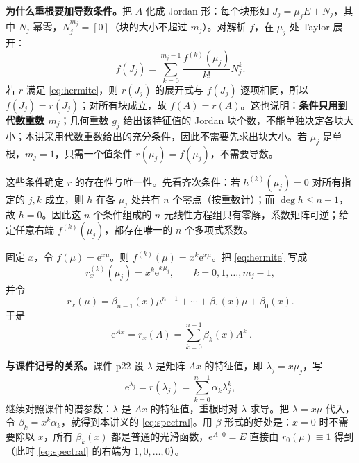 \documentclass[11pt]{ctexart}
\let\basesubhdr\subhdr
\renewcommand{\subhdr}[1]{\needspace{8\baselineskip}\basesubhdr{#1}}
\newcommand{\ee}{\mathrm{e}}
\begin{document}
\textbf{为什么重根要加导数条件。}把 $A$ 化成 Jordan 形：每个块形如 $J_j=\mu_jE+N_j$，其中 $N_j$ 幂零，$N_j^{m_j}=[0]$（块的大小不超过 $m_j$）。对解析 $f$，在 $\mu_j$ 处 Taylor 展开：
\[
f(J_j)=\sum_{k=0}^{m_j-1}\frac{f^{(k)}(\mu_j)}{k!}N_j^k .
\]
若 $r$ 满足 \eqref{eq:hermite}，则 $r(J_j)$ 的展开式与 $f(J_j)$ 逐项相同，所以 $f(J_j)=r(J_j)$；对所有块成立，故 $f(A)=r(A)$。这也说明：\textbf{条件只用到代数重数 $m_j$}；几何重数 $g_j$ 给出该特征值的 Jordan 块个数，不能单独决定各块大小；本讲采用代数重数给出的充分条件，因此不需要先求出块大小。若 $\mu_j$ 是单根，$m_j=1$，只需一个值条件 $r(\mu_j)=f(\mu_j)$，不需要导数。

这些条件确定 $r$ 的存在性与唯一性。先看齐次条件：若 $h^{(k)}(\mu_j)=0$ 对所有指定的 $j,k$ 成立，则 $h$ 在各 $\mu_j$ 处共有 $n$ 个零点（按重数计）；而 $\deg h\le n-1$，故 $h=0$。因此这 $n$ 个条件组成的 $n$ 元线性方程组只有零解，系数矩阵可逆；给定任意右端 $f^{(k)}(\mu_j)$，都存在唯一的 $n$ 个多项式系数。

\subhdr{4.3.2 取 $f(\mu)=\ee^{x\mu}$}

固定 $x$，令 $f(\mu)=\ee^{x\mu}$。则 $f^{(k)}(\mu)=x^k\ee^{x\mu}$。把 \eqref{eq:hermite} 写成
\begin{equation}
r_x^{(k)}(\mu_j)=x^k\ee^{x\mu_j},\qquad k=0,1,\dots,m_j-1,
\label{eq:spectral}
\end{equation}
并令
\[
r_x(\mu)=\beta_{n-1}(x)\mu^{n-1}+\cdots+\beta_1(x)\mu+\beta_0(x).
\]
于是
\begin{equation}
\boxed{\ \ee^{Ax}=r_x(A)=\sum_{k=0}^{n-1}\beta_k(x)A^k\ }.
\label{eq:ch}
\end{equation}


\textbf{与课件记号的关系。}课件 p22 设 $\lambda$ 是矩阵 $Ax$ 的特征值，即 $\lambda_j=x\mu_j$，写
\[
\ee^{\lambda_j}=r(\lambda_j)=\sum_{k=0}^{n-1}\alpha_k\lambda_j^k,
\]
继续对照课件的谱参数：$\lambda$ 是 $Ax$ 的特征值，重根时对 $\lambda$ 求导。把 $\lambda=x\mu$ 代入，令 $\beta_k=x^k\alpha_k$，就得到本讲义的 \eqref{eq:spectral}。用 $\beta$ 形式的好处是：$x=0$ 时不需要除以 $x$，所有 $\beta_k(x)$ 都是普通的光滑函数，$\ee^{A\cdot0}=E$ 直接由 $r_0(\mu)\equiv1$ 得到（此时 \eqref{eq:spectral} 的右端为 $1,0,\dots,0$）。
\end{document}
